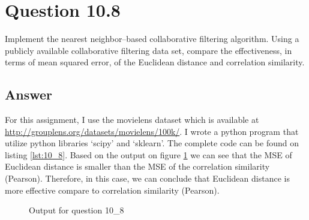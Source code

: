 \documentclass[letterpaper,11pt]{article}
\begin{document}
\noindent\makebox[\linewidth]{\rule{\textwidth}{0.4pt}}


\section*{Question 10.8}
\begin{spverbatim}
Implement the nearest neighbor–based collaborative filtering algorithm. Using a publicly available collaborative filtering data set, compare the effectiveness, in terms of mean squared error, of the Euclidean distance and correlation similarity.
\end{spverbatim}

\subsection*{Answer}
For this assignment, I use the movielens dataset which is available at \url{http://grouplens.org/datasets/movielens/100k/}. I wrote a python program that utilize python libraries `scipy' and `sklearn'. The complete code can be found on listing \ref{lst:10_8}. \newline
Based on the output on figure \ref{fig:10_8} we can see that the MSE of Euclidean distance is smaller than the MSE of the correlation similarity (Pearson). Therefore, in this case, we can conclude that Euclidean distance is more effective compare to correlation similarity (Pearson). 

\begin{figure}[H]
	\centering
	\caption{Output for question 10\_8}
	\label{fig:10_8}
\end{figure}
\end{document}
